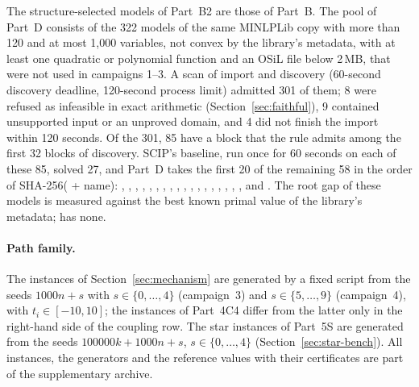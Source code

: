 \begin{sloppypar}
The structure-selected models of Part~B2 are those of Part~B. The pool of
Part~D consists of the 322 models of the same MINLPLib copy with more than 120
and at most 1{,}000 variables, not convex by the library's metadata, with at
least one quadratic or polynomial function and an OSiL file below 2\,MB, that
were not used in campaigns 1--3. A scan of import and discovery (60-second
discovery deadline, 120-second process limit) admitted 301 of them; 8 were
refused as infeasible in exact arithmetic (Section~\ref{sec:faithful}), 9
contained unsupported input or an unproved domain, and 4 did not finish the
import within 120 seconds. Of the 301, 85 have a block that the 
rule admits among the first 32 blocks of discovery.
SCIP's baseline, run once for 60 seconds on each of these 85, solved 27, and
Part~D takes the first 20 of the remaining 58 in the order of
SHA-256( + name): ,
, ,
, , ,
, , , ,
, , ,
, ,
, , ,
 and . The root gap of these models
is measured against the best known primal value of the library's metadata;
 has none.
\end{sloppypar}

\paragraph{Path family.} The instances of Section~\ref{sec:mechanism} are
generated by a fixed script from the seeds $1000n+s$ with $s\in\{0,\dots,4\}$
(campaign~3) and $s\in\{5,\dots,9\}$ (campaign~4), with $t_i\in[-10,10]$; the
instances of Part~4C4 differ from the latter only in the right-hand side of
the coupling row. The star instances of Part~5S are generated from the seeds
$100000k+1000n+s$, $s\in\{0,\dots,4\}$ (Section~\ref{sec:star-bench}). All
instances, the generators and the reference values with their certificates
are part of the supplementary archive.
